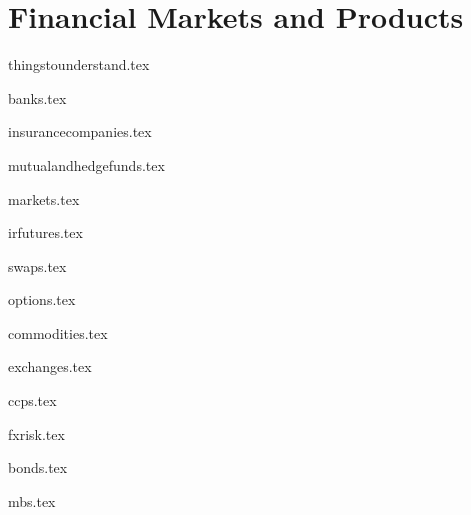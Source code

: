 \documentclass{report}
\begin{document}
	

\tableofcontents		

\part{Financial Markets and Products}

{thingstounderstand.tex}
\pagebreak

{banks.tex}
\pagebreak

{insurancecompanies.tex}
\pagebreak

{mutualandhedgefunds.tex}
\pagebreak

{markets.tex}
\pagebreak

{irfutures.tex}
\pagebreak

{swaps.tex}
\pagebreak

{options.tex}
\pagebreak

{commodities.tex}
\pagebreak

{exchanges.tex}
\pagebreak

{ccps.tex}
\pagebreak

{fxrisk.tex}
\pagebreak

{bonds.tex}
\pagebreak

{mbs.tex}
\pagebreak
\end{document}
